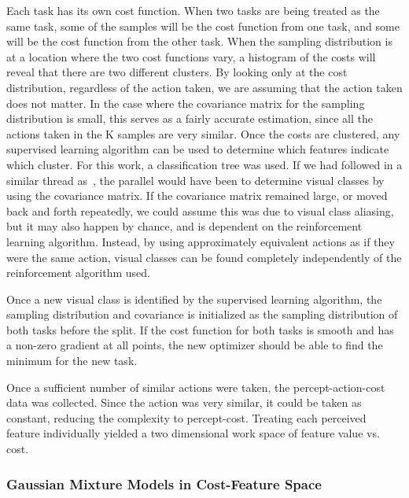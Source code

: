 \documentclass[12pt]{article}
\begin{document}
\color{red}Each task has its own cost function. When two tasks are being treated as the same task, some of the samples will be the cost function from one task, and some will be the cost function from the other task. \color{black} When the sampling distribution is at a location where the two cost functions vary, a histogram of the costs will reveal that there are two different clusters. By looking only at the cost distribution, regardless of the action taken, we are assuming that the action taken does not matter. In the case where the covariance matrix for the sampling distribution is small, this serves as a fairly accurate estimation, since all the actions taken in the K samples are very similar. Once the costs are clustered, any supervised learning algorithm can be used to determine which features indicate which cluster. For this work, a classification tree was used. If we had followed in a similar thread as~\citet{piater11learning}, the parallel would have been to determine visual classes by using the covariance matrix. If the covariance matrix remained large, or moved back and forth repeatedly, we could assume this was due to visual class aliasing, but it may also happen by chance, and is dependent on the reinforcement learning algorithm. Instead, by using approximately equivalent actions as if they were the same action, visual classes can be found completely independently of the reinforcement algorithm used. 

Once a new visual class is identified by the supervised learning algorithm, the sampling distribution and covariance is initialized as the sampling distribution of both tasks before the split. If the cost function for both tasks is smooth and has a non-zero gradient at all points, the new optimizer should be able to find the minimum for the new task. 





Once a sufficient number of similar actions were taken, the percept-action-cost data was collected. Since the action was very similar, it could be taken as constant, reducing the complexity to percept-cost. Treating each perceived feature individually yielded a two dimensional work space of feature value vs. cost. 

\subsubsection{Gaussian Mixture Models in Cost-Feature Space}
\end{document}
